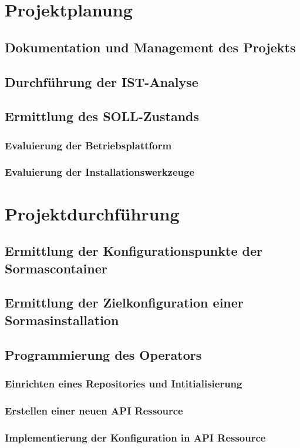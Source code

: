 \documentclass[a4paper,11pt]{article}
\begin{document}
  \section{Projektplanung}
    \subsection{Dokumentation und Management des Projekts}
    \subsection{Durchführung der IST-Analyse}
    \subsection{Ermittlung des SOLL-Zustands}
      \subsubsection{Evaluierung der Betriebsplattform}
      \subsubsection{Evaluierung der Installationswerkzeuge}
  \section{Projektdurchführung}
    \subsection{Ermittlung der Konfigurationspunkte der Sormascontainer}
    \subsection{Ermittlung der Zielkonfiguration einer Sormasinstallation}
    \subsection{Programmierung des Operators}
      \subsubsection{Einrichten eines Repositories und Intitialisierung}
      \subsubsection{Erstellen einer neuen API Ressource}
      \subsubsection{Implementierung der Konfiguration in API Ressource}
\end{document}
